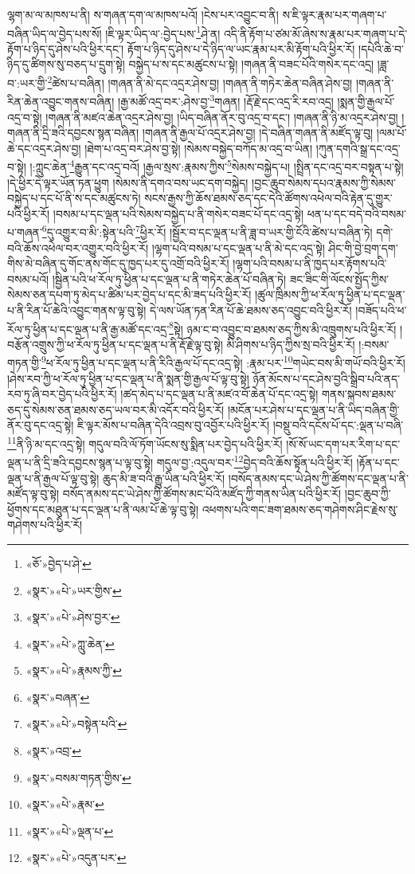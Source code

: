 ལྷག་མ་ལ་མཁས་པ་ནི། ས་གཞན་དག་ལ་མཁས་པའོ། །ངེས་པར་འབྱུང་བ་ནི། ས་ཇི་ལྟར་རྣམ་པར་གཞག་པ་བཞིན་ཡིད་ལ་བྱེད་པས་སོ། །ཇི་ལྟར་ཡིད་ལ་:བྱེད་པས་\footnote{«ཅོ་»བྱེད་པ་ཤེ་}ཤེ་ན། འདི་ནི་རྟོག་པ་ཙམ་མོ་ཞེས་ས་རྣམ་པར་གཞག་པ་དེ་རྟོག་པ་ཉིད་དུ་ཤེས་པའི་ཕྱིར་དང་། རྟོག་པ་ཉིད་དུ་ཤེས་པ་དེ་ཉིད་ལ་ཡང་རྣམ་པར་མི་རྟོག་པའི་ཕྱིར་རོ། །དཔེའི་ཆེ་བ་ཉིད་དུ་ཚིགས་སུ་བཅད་པ་དྲུག་སྟེ། བསྐྱེད་པ་ས་དང་མཚུངས་པ་སྟེ། །གཞན་ནི་བཟང་པོའི་གསེར་དང་འདྲ། །ཟླ་བ་:ཡར་གྱི་\footnote{«སྣར་»«པེ་»ཡར་གྱིས་}ཚེས་པ་བཞིན། །གཞན་ནི་མེ་དང་འདྲར་ཤེས་བྱ། །གཞན་ནི་གཏེར་ཆེན་བཞིན་ཤེས་བྱ། །གཞན་ནི་རིན་ཆེན་འབྱུང་གནས་བཞིན། །རྒྱ་མཚོ་འདྲ་བར་:ཤེས་བྱ་\footnote{«སྣར་»«པེ་»ཤེས་བྱར་}གཞན། །རྡོ་རྗེ་དང་འདྲ་རི་རབ་འདྲ། །སྨན་གྱི་རྒྱལ་པོ་འདྲ་བ་སྟེ། །གཞན་ནི་མཛའ་ཆེན་འདྲར་ཤེས་བྱ། །ཡིད་བཞིན་ནོར་བུ་འདྲ་བ་དང་། །གཞན་ནི་ཉི་མ་འདྲར་ཤེས་བྱ། །གཞན་ནི་དྲི་ཟའི་དབྱངས་སྙན་བཞིན། །གཞན་ནི་རྒྱལ་པོ་འདྲར་ཤེས་བྱ། །དེ་བཞིན་གཞན་ནི་མཛོད་ལྟ་བུ། །ལམ་པོ་ཆེ་དང་འདྲར་ཤེས་བྱ། །ཐེག་པ་འདྲ་བར་ཤེས་བྱ་སྟེ། །སེམས་བསྐྱེད་བཀོད་མ་འདྲ་བ་ཡིན། །ཀུན་དགའི་སྒྲ་དང་འདྲ་བ་སྟེ། །:ཀླུང་ཆེན་\footnote{«སྣར་»«པེ་»ཀླུ་ཆེན་}རྒྱུན་དང་འདྲ་བའོ། །རྒྱལ་སྲས་:རྣམས་ཀྱིས་\footnote{«སྣར་»«པེ་»རྣམས་ཀྱི་}སེམས་བསྐྱེད་པ། །སྤྲིན་དང་འདྲ་བར་བསྟན་པ་སྟེ། །དེ་ཕྱིར་དེ་ལྟར་ཡོན་ཏན་ཕྱུག །སེམས་ནི་དགའ་བས་ཡང་དག་བསྐྱེད། །བྱང་ཆུབ་སེམས་དཔའ་རྣམས་ཀྱི་སེམས་བསྐྱེད་པ་དང་པོ་ནི་ས་དང་མཚུངས་ཏེ། སངས་རྒྱས་ཀྱི་ཆོས་ཐམས་ཅད་དང་དེའི་ཚོགས་འཕེལ་བའི་རྟེན་དུ་གྱུར་པའི་ཕྱིར་རོ། །བསམ་པ་དང་ལྡན་པའི་སེམས་བསྐྱེད་པ་ནི་གསེར་བཟང་པོ་དང་འདྲ་སྟེ། ཕན་པ་དང་བདེ་བའི་བསམ་པ་གཞན་\footnote{«སྣར་»བཞན་}དུ་འགྱུར་བ་མི་:སྟེན་པའི་\footnote{«སྣར་»«པེ་»བསྟེན་པའི་}ཕྱིར་རོ། །སྦྱོར་བ་དང་ལྡན་པ་ནི་ཟླ་བ་ཡར་གྱི་ངོའི་ཚེས་པ་བཞིན་ཏེ། དགེ་བའི་ཆོས་འཕེལ་བར་འགྱུར་བའི་ཕྱིར་རོ། །ལྷག་པའི་བསམ་པ་དང་ལྡན་པ་ནི་མེ་དང་འདྲ་སྟེ། ཤིང་གི་བྱེ་བྲག་དག་གིས་མེ་བཞིན་དུ་གོང་ནས་གོང་དུ་ཁྱད་པར་དུ་འགྲོ་བའི་ཕྱིར་རོ། །ལྷག་པའི་བསམ་པ་ནི་ཁྱད་པར་རྟོགས་པའི་བསམ་པའོ། །སྦྱིན་པའི་ཕ་རོལ་ཏུ་ཕྱིན་པ་དང་ལྡན་པ་ནི་གཏེར་ཆེན་པོ་བཞིན་ཏེ། ཟང་ཟིང་གི་ལོངས་སྤྱོད་ཀྱིས་སེམས་ཅན་དཔག་ཏུ་མེད་པ་ཚིམ་པར་བྱེད་པ་དང་མི་ཟད་པའི་ཕྱིར་རོ། །ཚུལ་ཁྲིམས་ཀྱི་ཕ་རོལ་ཏུ་ཕྱིན་པ་དང་ལྡན་པ་ནི་རིན་པོ་ཆེའི་འབྱུང་གནས་ལྟ་བུ་སྟེ། དེ་ལས་ཡོན་ཏན་རིན་པོ་ཆེ་ཐམས་ཅད་འབྱུང་བའི་ཕྱིར་རོ། །བཟོད་པའི་ཕ་རོལ་ཏུ་ཕྱིན་པ་དང་ལྡན་པ་ནི་རྒྱ་མཚོ་དང་འདྲ་\footnote{«སྣར་»འབྲ་}སྟེ། ཉམ་ང་བ་འབྱུང་བ་ཐམས་ཅད་ཀྱིས་མི་འཁྲུགས་པའི་ཕྱིར་རོ། །བརྩོན་འགྲུས་ཀྱི་ཕ་རོལ་ཏུ་ཕྱིན་པ་དང་ལྡན་པ་ནི་རྡོ་རྗེ་ལྟ་བུ་སྟེ། མི་ཤིགས་པ་ཉིད་ཀྱིས་སྲ་བའི་ཕྱིར་རོ། །:བསམ་གཏན་གྱི་\footnote{«སྣར་»བསམ་གཏན་གྱིས་}ཕ་རོལ་ཏུ་ཕྱིན་པ་དང་ལྡན་པ་ནི་རིའི་རྒྱལ་པོ་དང་འདྲ་སྟེ། :རྣམ་པར་\footnote{«སྣར་»«པེ་»རྣམ་}གཡེང་བས་མི་གཡོ་བའི་ཕྱིར་རོ། །ཤེས་རབ་ཀྱི་ཕ་རོལ་ཏུ་ཕྱིན་པ་དང་ལྡན་པ་ནི་སྨན་གྱི་རྒྱལ་པོ་ལྟ་བུ་སྟེ། ཉོན་མོངས་པ་དང་ཤེས་བྱའི་སྒྲིབ་པའི་ནད་རབ་ཏུ་ཞི་བར་བྱེད་པའི་ཕྱིར་རོ། །ཚད་མེད་པ་དང་ལྡན་པ་ནི་མཛའ་བོ་ཆེན་པོ་དང་འདྲ་སྟེ། གནས་སྐབས་ཐམས་ཅད་དུ་སེམས་ཅན་ཐམས་ཅད་ཡལ་བར་མི་འདོར་བའི་ཕྱིར་རོ། །མངོན་པར་ཤེས་པ་དང་ལྡན་པ་ནི་ཡིད་བཞིན་གྱི་ནོར་བུ་དང་འདྲ་སྟེ། ཇི་ལྟར་མོས་པ་བཞིན་དེའི་འབྲས་བུ་འབྱོར་པའི་ཕྱིར་རོ། །བསྡུ་བའི་དངོས་པོ་དང་:ལྡན་པ་བཞི་\footnote{«སྣར་»«པེ་»ལྡན་པ་}ནི་ཉི་མ་དང་འདྲ་སྟེ། གདུལ་བའི་ལོ་ཏོག་ཡོངས་སུ་སྨིན་པར་བྱེད་པའི་ཕྱིར་རོ། །སོ་སོ་ཡང་དག་པར་རིག་པ་དང་ལྡན་པ་ནི་དྲི་ཟའི་དབྱངས་སྙན་པ་ལྟ་བུ་སྟེ། གདུལ་བྱ་:འདུལ་བར་\footnote{«སྣར་»«པེ་»འདུན་པར་}བྱེད་བའི་ཆོས་སྟོན་པའི་ཕྱིར་རོ། །རྟོན་པ་དང་ལྡན་པ་ནི་རྒྱལ་པོ་ལྟ་བུ་སྟེ། ཆུད་མི་ཟ་བའི་རྒྱུ་ཡིན་པའི་ཕྱིར་རོ། །བསོད་ནམས་དང་ཡེ་ཤེས་ཀྱི་ཚོགས་དང་ལྡན་པ་ནི་མཛོད་ལྟ་བུ་སྟེ། བསོད་ནམས་དང་ཡེ་ཤེས་ཀྱི་ཚོགས་མང་པོའི་མཛོད་ཀྱི་གནས་ཡིན་པའི་ཕྱིར་རོ། །བྱང་ཆུབ་ཀྱི་ཕྱོགས་དང་མཐུན་པ་དང་ལྡན་པ་ནི་ལམ་པོ་ཆེ་ལྟ་བུ་སྟེ། འཕགས་པའི་གང་ཟག་ཐམས་ཅད་གཤེགས་ཤིང་རྗེས་སུ་གཤེགས་པའི་ཕྱིར་རོ། 